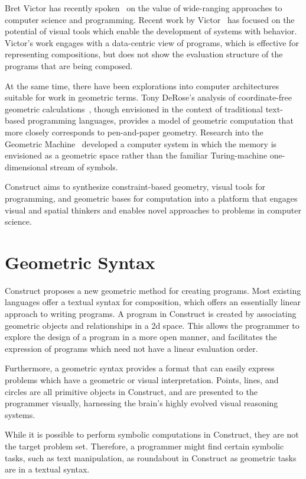 \documentclass[twoside,openright,11pt]{report}
\begin{document}
Bret Victor has recently spoken~\cite{victor2013future} on the value of wide-ranging approaches to computer science and programming.
Recent work by Victor~\cite{victor2013unthinkable,victor2013deadfish} has focused on the potential of visual tools which enable the development of systems with behavior.
Victor's work engages with a data-centric view of programs, which is effective for representing compositions, but does not show the evaluation structure of the programs that are being composed.

At the same time, there have been explorations into computer architectures suitable for work in geometric terms.
Tony DeRose's analysis of coordinate-free geometric calculations~\cite{derose1989coordinatefree}, though envisioned in the context of traditional text-based programming languages, provides a model of geometric computation that more closely corresponds to pen-and-paper geometry.
Research into the Geometric Machine~\cite{reiser2003programming} developed a computer system in which the memory is envisioned as a geometric space rather than the familiar Turing-machine one-dimensional stream of symbols.

Construct aims to synthesize constraint-based geometry, visual tools for programming, and geometric bases for computation into a platform that engages visual and spatial thinkers and enables novel approaches to problems in computer science.

\chapter{Geometric Syntax}
\label{chap:syntax}

Construct proposes a new geometric method for creating programs. 
Most existing languages offer a textual syntax for composition, which offers an essentially linear approach to writing programs. 
A program in Construct is created by associating geometric objects and relationships in a 2d space. 
This allows the programmer to explore the design of a program in a more open manner, and facilitates the expression of programs which need not have a linear evaluation order. 

Furthermore, a geometric syntax provides a format that can easily express problems which have a geometric or visual interpretation. 
Points, lines, and circles are all primitive objects in Construct, and are presented to the programmer visually, harnessing the brain's highly evolved visual reasoning systems. 

While it is possible to perform symbolic computations in Construct, they are not the target problem set. 
Therefore, a programmer might find certain symbolic tasks, such as text manipulation, as roundabout in Construct as geometric tasks are in a textual syntax.
\end{document}
